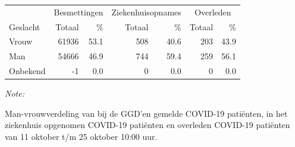 \documentclass[
  english,
  man,floatsintext]{apa6}
\begin{document}
\begin{table}[H]
\centering\begingroup\fontsize{11}{13}\selectfont

\begin{threeparttable}
\begin{tabular}{lrrrrrr}
\toprule
\multicolumn{1}{c}{ } & \multicolumn{2}{c}{Besmettingen} & \multicolumn{2}{c}{Ziekenhuisopnames} & \multicolumn{2}{c}{Overleden} \\
\cmidrule(l{3pt}r{3pt}){2-3} \cmidrule(l{3pt}r{3pt}){4-5} \cmidrule(l{3pt}r{3pt}){6-7}
Geslacht & Totaal & \% & Totaal & \% & Totaal & \%\\
\midrule
Vrouw & 61936 & 53.1 & 508 & 40.6 & 203 & 43.9\\
Man & 54666 & 46.9 & 744 & 59.4 & 259 & 56.1\\
Onbekend & -1 & 0.0 & 0 & 0.0 & 0 & 0.0\\
\bottomrule
\end{tabular}
\begin{tablenotes}
\item \textit{Note: } 
\item Man-vrouwverdeling van bij de GGD’en gemelde COVID-19 patiënten, in het ziekenhuis opgenomen COVID-19 patiënten en overleden COVID-19 patiënten van 11 oktober t/m 25 oktober 10:00 uur.
\end{tablenotes}
\end{threeparttable}
\endgroup{}
\end{table}
\newpage
\end{document}
